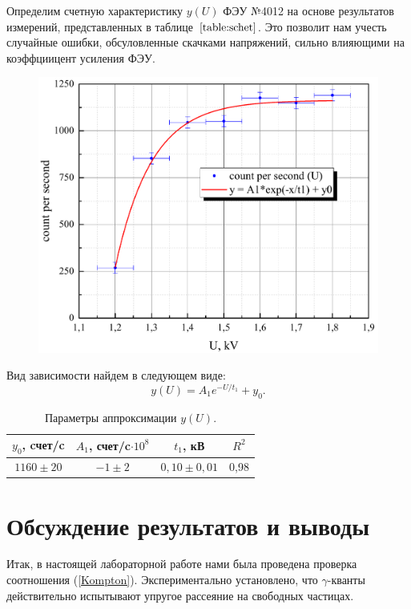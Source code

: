 \documentclass[a4paper,12pt]{article} %
\begin{document}
		\newpage
		Определим счетную характеристику $y(U)$ ФЭУ №4012 на основе результатов измерений, представленных в таблице~$\ref{table:schet}$. Это позволит нам учесть случайные ошибки, обсуловленные скачками напряжений, сильно влияющими на коэффциицент усиления ФЭУ.
		
		\begin{figure}[h!]
			\begin{floatrow}
				{\includegraphics[scale=0.5]{graph2.pdf}}        
			\end{floatrow}
		\end{figure}
	
		Вид зависимости найдем в следующем виде:
		\begin{equation*}
			y (U) = A_1 e^{-U/t_1} + y_0.
		\end{equation*}
	
		\begin{table}[H]
			\caption{Параметры аппроксимации $y(U)$.}
			\label{table:exp}
			\begin{tabular}{|c|c|c|c|}
				\hline
				$y_0$, cчет/c & $A_1$, счет/c$\cdot 10^8$ & $t_1$, кВ & $R^2$ \\ \hline
				$1160 \pm 20$ & $-1 \pm 2$                & $0,10 \pm 0,01$  & 0,98  \\ \hline
			\end{tabular}
		\end{table}
\newpage
\section{Обсуждение результатов и выводы}
	Итак, в настоящей лабораторной работе нами была проведена проверка соотношения (\ref{Kompton}). Экспериментально установлено, что $\gamma$-кванты действительно испытывают упругое рассеяние на свободных частицах. 
	
\end{document}
